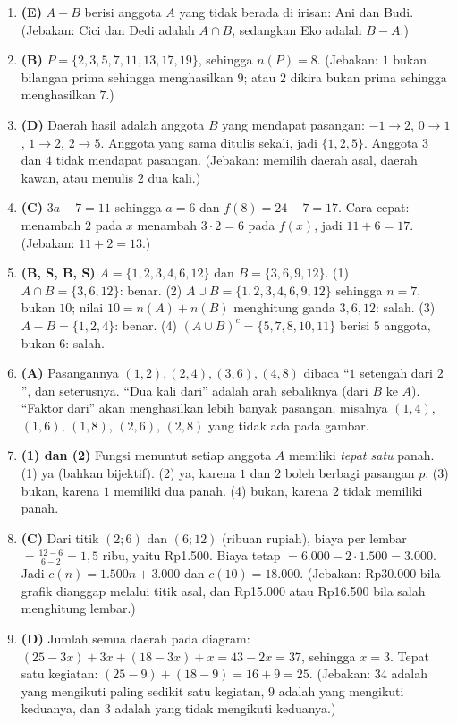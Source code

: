 \documentclass[a4paper,11pt]{article}
\begin{document}
\small\begin{enumerate}[leftmargin=2em,itemsep=2pt,topsep=2pt]
\item[\textbf{1.}] \textbf{(E)} $A-B$ berisi anggota $A$ yang tidak berada di irisan: Ani dan Budi. (Jebakan: Cici dan Dedi adalah $A\cap B$, sedangkan Eko adalah $B-A$.)
\item[\textbf{2.}] \textbf{(B)} $P=\{2,3,5,7,11,13,17,19\}$, sehingga $n(P)=8$. (Jebakan: $1$ bukan bilangan prima sehingga menghasilkan $9$; atau $2$ dikira bukan prima sehingga menghasilkan $7$.)
\item[\textbf{3.}] \textbf{(D)} Daerah hasil adalah anggota $B$ yang mendapat pasangan: $-1\to2$, $0\to1$, $1\to2$, $2\to5$. Anggota yang sama ditulis sekali, jadi $\{1,2,5\}$. Anggota $3$ dan $4$ tidak mendapat pasangan. (Jebakan: memilih daerah asal, daerah kawan, atau menulis $2$ dua kali.)
\item[\textbf{4.}] \textbf{(C)} $3a-7=11$ sehingga $a=6$ dan $f(8)=24-7=17$. Cara cepat: menambah $2$ pada $x$ menambah $3\cdot2=6$ pada $f(x)$, jadi $11+6=17$. (Jebakan: $11+2=13$.)
\item[\textbf{5.}] \textbf{(B, S, B, S)} $A=\{1,2,3,4,6,12\}$ dan $B=\{3,6,9,12\}$. (1) $A\cap B=\{3,6,12\}$: benar. (2) $A\cup B=\{1,2,3,4,6,9,12\}$ sehingga $n=7$, bukan $10$; nilai $10=n(A)+n(B)$ menghitung ganda $3,6,12$: salah. (3) $A-B=\{1,2,4\}$: benar. (4) $(A\cup B)^c=\{5,7,8,10,11\}$ berisi $5$ anggota, bukan $6$: salah.
\item[\textbf{6.}] \textbf{(A)} Pasangannya $(1,2),(2,4),(3,6),(4,8)$ dibaca ``$1$ setengah dari $2$'', dan seterusnya. ``Dua kali dari'' adalah arah sebaliknya (dari $B$ ke $A$). ``Faktor dari'' akan menghasilkan lebih banyak pasangan, misalnya $(1,4)$, $(1,6)$, $(1,8)$, $(2,6)$, $(2,8)$ yang tidak ada pada gambar.
\item[\textbf{7.}] \textbf{(1) dan (2)} Fungsi menuntut setiap anggota $A$ memiliki \emph{tepat satu} panah. (1) ya (bahkan bijektif). (2) ya, karena $1$ dan $2$ boleh berbagi pasangan $p$. (3) bukan, karena $1$ memiliki dua panah. (4) bukan, karena $2$ tidak memiliki panah.
\item[\textbf{8.}] \textbf{(C)} Dari titik $(2;6)$ dan $(6;12)$ (ribuan rupiah), biaya per lembar $=\frac{12-6}{6-2}=1{,}5$ ribu, yaitu Rp1.500. Biaya tetap $=6.000-2\cdot1.500=3.000$. Jadi $c(n)=1.500n+3.000$ dan $c(10)=18.000$. (Jebakan: Rp30.000 bila grafik dianggap melalui titik asal, dan Rp15.000 atau Rp16.500 bila salah menghitung lembar.)
\item[\textbf{9.}] \textbf{(D)} Jumlah semua daerah pada diagram: $(25-3x)+3x+(18-3x)+x=43-2x=37$, sehingga $x=3$. Tepat satu kegiatan: $(25-9)+(18-9)=16+9=25$. (Jebakan: $34$ adalah yang mengikuti paling sedikit satu kegiatan, $9$ adalah yang mengikuti keduanya, dan $3$ adalah yang tidak mengikuti keduanya.)

\end{enumerate}
\end{document}
